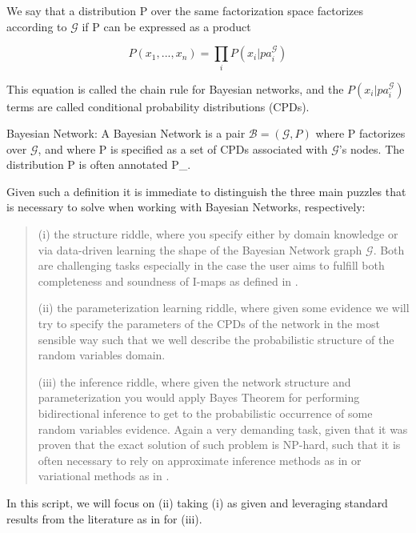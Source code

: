 \documentclass[11pt]{article}
\begin{document}
\begin{article}
\begin{definition}
We say that a distribution P over the same factorization space factorizes
according to $\mathscr{G}$ if P can be expressed as a product 

$$P (x_1, ..., x_n) = \prod_i P(x_i | pa_i^{\mathscr{G}})$$

This equation is called the chain rule for Bayesian networks, and the $P(x_i | pa_i^{\mathscr{G}})$ terms are
called conditional probability distributions (CPDs).
\end{definition}


\begin{definition}  
Bayesian Network: A Bayesian Network is a pair $\mathscr{B} = (\mathscr{G}, P)$ where P factorizes over $\mathscr{G}$,
and where P is specified as a set of CPDs associated with  $\mathscr{G}$’s nodes. The distribution P is often annotated P_{}.
\end{definition}

Given such a definition it is immediate to distinguish the three
main puzzles that is necessary to solve when working with Bayesian
Networks, respectively:

\begin{quote}
(i) the structure riddle, where you specify either by domain knowledge
or via data-driven learning the shape of the Bayesian Network graph
\(\mathscr{G}\). Both are challenging tasks especially in the case
the user aims to fulfill both completeness and soundness of I-maps
as defined in \cite{koller2009probabilistic}.

(ii) the parameterization learning riddle, where given some
evidence we will try to specify the parameters of the CPDs of the
network in the most sensible way such that we well describe the
probabilistic structure of the random variables domain.

(iii) the inference riddle, where given the network structure and
parameterization you would apply Bayes Theorem for performing
bidirectional inference to get to the probabilistic occurrence of
some random variables evidence. Again a very demanding task, given
that it was proven that the exact solution of such problem is NP-hard,
such that it is often necessary to rely on approximate inference
methods as in \cite{pearl1987evidential} or variational methods as in
\cite{jordan1999introduction}.
\end{quote}


In this script, we will focus on (ii) taking (i) as given and
leveraging standard results from the literature as in
\cite{koller2009probabilistic} for (iii).


\end{article}
\end{document}
